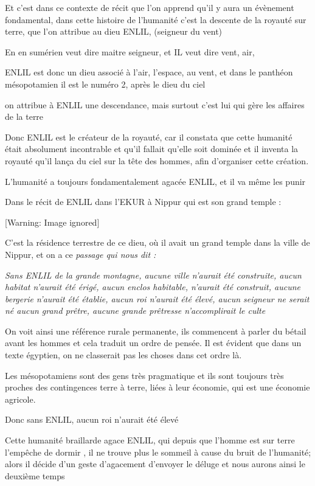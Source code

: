 \documentclass[a4paper,10pt]{article}
\begin{document}
\begin{itemize}
Et c'est dans ce contexte de récit que
l'on apprend qu'il y aura un
évènement fondamental, dans cette histoire de
l'humanité c'est la descente de la
royauté sur terre, que l'on attribue au dieu ENLIL,
(seigneur du vent)

En en sumérien veut dire maitre seigneur, et IL veut dire vent, air, 

ENLIL est donc un dieu associé à l'air,
l'espace, au vent, et dans le panthéon mésopotamien il
est le numéro 2, après le dieu du ciel

on attribue à ENLIL une descendance, mais surtout c'est
lui qui gère les affaires de la terre

Donc ENLIL est le créateur de la royauté, car il constata que cette
humanité était absolument incontrable et qu'il fallait
qu'elle soit dominée et il inventa la royauté
qu'il lança du ciel sur la tête des hommes, afin
d'organiser cette création. 

L'humanité a toujours fondamentalement agacée ENLIL, 
et il va même les punir

Dans le récit de ENLIL dans l'EKUR à Nippur qui est son
grand temple :

  [Warning: Image ignored] %
 

C'est la résidence terrestre de ce dieu, où il avait un
grand temple dans la ville de Nippur, et on a ce \textit{passage qui
nous dit :}

\textit{{\textquotedbl}Sans ENLIL de la grande montagne, aucune ville
n'aurait été construite, aucun habitat
n'aurait été érigé, aucun enclos habitable,
n'aurait été construit, aucune bergerie
n'aurait été établie, aucun roi
n'aurait été élevé, aucun seigneur ne serait  né aucun
grand prêtre, aucune grande prêtresse n'accomplirait
le culte} {\textquotedbl} 

On voit ainsi une référence rurale permanente, ils commencent à parler
du bétail avant les hommes et cela traduit un ordre de pensée. Il est
évident que dans un texte égyptien, on ne classerait pas les choses
dans cet ordre là.

Les mésopotamiens sont des gens très pragmatique et ils sont toujours
très proches des contingences  terre à terre, liées à leur économie,
qui est une économie agricole.

Donc sans ENLIL, aucun roi n'aurait été élevé

Cette humanité braillarde agace ENLIL, qui depuis que
l'homme est sur terre l'empêche de
dormir , il ne trouve plus le sommeil à cause du bruit de
l'humanité; alors il décide d'un
geste d'agacement d'envoyer le déluge
et nous aurons ainsi le deuxième temps


\end{itemize}
\end{document}
